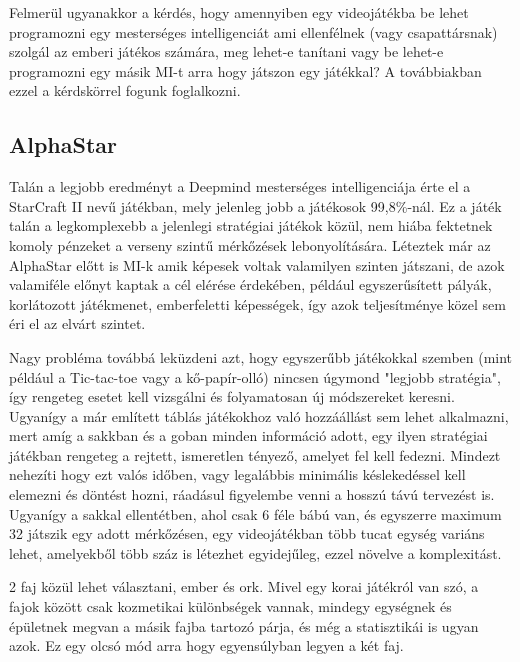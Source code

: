 Felmerül ugyanakkor a kérdés, hogy amennyiben egy videojátékba be lehet programozni egy mesterséges intelligenciát ami ellenfélnek (vagy csapattársnak) szolgál az emberi játékos számára, meg lehet-e tanítani vagy be lehet-e programozni egy másik MI-t arra hogy játszon egy játékkal? A továbbiakban ezzel a kérdskörrel fogunk foglalkozni.


\subsection{AlphaStar}
Talán a legjobb eredményt a Deepmind mesterséges intelligenciája érte el a StarCraft II nevű játékban, mely jelenleg jobb a játékosok 99,8\%-nál. 
Ez a játék talán a legkomplexebb a jelenlegi stratégiai játékok közül, nem hiába fektetnek komoly pénzeket a verseny szintű mérkőzések lebonyolítására.
Léteztek már az AlphaStar előtt is MI-k amik képesek voltak valamilyen szinten játszani, de azok valamiféle előnyt kaptak a cél elérése érdekében, például egyszerűsített pályák, korlátozott játékmenet, emberfeletti képességek, így azok teljesítménye közel sem éri el az elvárt szintet.

Nagy probléma továbbá leküzdeni azt, hogy egyszerűbb játékokkal szemben (mint például a Tic-tac-toe vagy a kő-papír-olló) nincsen úgymond "legjobb stratégia", így rengeteg esetet kell vizsgálni és folyamatosan új módszereket keresni. Ugyanígy a már említett táblás játékokhoz való hozzáállást sem lehet alkalmazni, mert amíg a sakkban és a goban minden információ adott, egy ilyen stratégiai játékban rengeteg a rejtett, ismeretlen tényező, amelyet fel kell fedezni. Mindezt nehezíti hogy ezt valós időben, vagy legalábbis minimális késlekedéssel kell elemezni és döntést hozni, ráadásul figyelembe venni a hosszú távú tervezést is. Ugyanígy a sakkal ellentétben, ahol csak 6 féle bábú van, és egyszerre maximum 32 játszik egy adott mérkőzésen, egy videojátékban több tucat egység variáns lehet, amelyekből több száz is létezhet egyidejűleg, ezzel növelve a komplexitást.


2 faj közül lehet választani, ember és ork. Mivel egy korai játékról van szó, a fajok között csak kozmetikai különbségek vannak, mindegy egységnek és épületnek megvan a másik fajba tartozó párja, és még a statisztikái is ugyan azok. Ez egy olcsó mód arra hogy egyensúlyban legyen a két faj.

